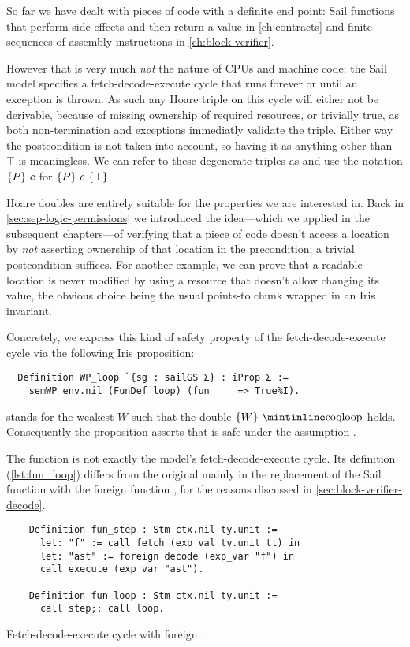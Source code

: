 So far we have dealt with pieces of code with a definite end point: Sail functions that perform side effects and then return a value in \cref{ch:contracts} and finite sequences of assembly instructions in \cref{ch:block-verifier}.

However that is very much \emph{not} the nature of CPUs and machine code: the Sail model specifies a fetch-decode-execute cycle that runs forever or until an exception is thrown. As such any Hoare triple on this cycle will either not be derivable, \ie because of missing ownership of required resources, or trivially true, as both non-termination and exceptions immediatly validate the triple. Either way the postcondition is not taken into account, so having it as anything other than \(\top\) is meaningless. We can refer to these degenerate triples as  and use the notation \(\left\{P\right\}\,c\) for \(\hoare{P}{c}{\top}\).

Hoare doubles are entirely suitable for the properties we are interested in. Back in \cref{sec:sep-logic-permissions} we introduced the idea---which we applied in the subsequent chapters---of verifying that a piece of code doesn't access a location by \emph{not} asserting ownership of that location in the precondition; a trivial postcondition suffices. For another example, we can prove that a readable location is never modified by using a resource that doesn't allow changing its value, the obvious choice being the usual points-to chunk wrapped in an Iris invariant.

Concretely, we express this kind of safety property of the fetch-decode-execute cycle via the following Iris proposition:
\begin{verbatim}
  Definition WP_loop `{sg : sailGS Σ} : iProp Σ :=
    semWP env.nil (FunDef loop) (fun _ _ => True%I).
\end{verbatim}
 stands for the weakest \(W\) such that the double \(\hoared{W}{\text{\coq{loop}}}\) holds. Consequently the proposition  asserts that  is safe under the assumption .

The  function is not exactly the model's fetch-decode-execute cycle. Its definition (\cref{lst:fun_loop}) differs from the original mainly in the replacement of the  Sail function with the foreign function , for the reasons discussed in \cref{sec:block-verifier-decode}.

\begin{listing}[tb]
  \begin{verbatim}
    Definition fun_step : Stm ctx.nil ty.unit :=
      let: "f" := call fetch (exp_val ty.unit tt) in
      let: "ast" := foreign decode (exp_var "f") in
      call execute (exp_var "ast").

    Definition fun_loop : Stm ctx.nil ty.unit :=
      call step;; call loop.
  \end{verbatim}
  \caption{Fetch-decode-execute cycle with foreign .}
  \label{lst:fun_loop}
\end{listing}

